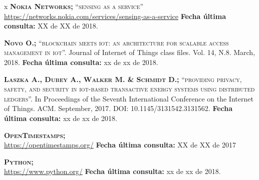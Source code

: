 \begin{thebibliography} {x}
	 \textsc{\textbf{Nokia Networks; }}\textsc{“sensing as a service”} \\ 
	\url{https://networks.nokia.com/services/sensing-as-a-service}
	\newline \textbf{Fecha última consulta:} XX de XX de 2018.
		
	 \textsc{\textbf{Novo O.; }} \textsc{“blockchain meets iot: an architecture for scalable access management in iot”.} Journal of Internet of Things class files. Vol. 14, N.8. March, 2018.	
	\newline \textbf{Fecha última consulta:} xx de xx de 2018.
	
	 \textsc{\textbf{Laszka A., Dubey A., Walker M. \& Schmidt D.; }} \textsc{“providing privacy, safety, and security in iot-based transactive energy systems using distributed ledgers”.} In Proceedings of the Seventh International Conference on the Internet of Things. ACM. September, 2017. DOI: 10.1145/3131542.3131562.	
	\newline \textbf{Fecha última consulta:} xx de xx de 2018.
		
		
	

	 \textsc{\textbf{OpenTimestamps; }} \\ 
	\url{https://opentimestamps.org/} 
	\newline \textbf{Fecha última consulta:} XX de XX de 2017		
		
	 \textsc{\textbf{Python; }} \\ 
	\url{https://www.python.org/}
	\newline \textbf{Fecha última consulta:} xx de xx de 2018.
		

\end{thebibliography}
